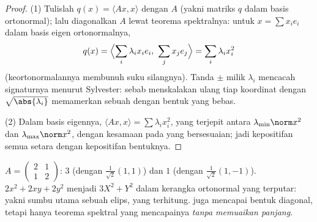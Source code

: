 \begin{proof}
(1) Tulislah $q(x) = \langle A x, x\rangle$ dengan $A$  (yakni
matriks $q$ dalam basis ortonormal); lalu diagonalkan $A$ lewat
teorema spektralnya: untuk $x = \sum x_ie_i$ dalam basis eigen
ortonormalnya,
\[
q(x) = \Bigl\langle \sum_i \lambda_ix_ie_i,\ \sum_j
x_je_j\Bigr\rangle = \sum_i \lambda_i x_i^2
\]
(keortonormalannya membunuh suku silangnya). Tanda $\pm$ milik
$\lambda_i$ mencacah signaturnya menurut Sylvester: sebab menskalakan ulang tiap
koordinat dengan $\sqrt{\abs{\lambda_i}}$ memamerkan sebuah  dengan bentuk yang bebas.

(2) Dalam basis eigennya, $\langle Ax, x\rangle = \sum \lambda_i
x_i^2$, yang terjepit antara $\lambda_{\min}\norm x^2$ dan
$\lambda_{\max}\norm x^2$, dengan kesamaan pada  yang
bersesuaian; jadi kepositifan semua  setara
dengan kepositifan bentuknya.
\end{proof}

\begin{example}\label{ex:b2:quadratic:spectralexample}
$A = \begin{pmatrix} 2 & 1\\ 1 & 2 \end{pmatrix}$:  $3$
(dengan  $\frac{1}{\sqrt2}(1,1)$) dan $1$
(dengan $\frac{1}{\sqrt2}(1,-1)$).  $2x^2 + 2xy + 2y^2$
menjadi $3X^2 + Y^2$ dalam kerangka ortonormal yang terputar: yakni
sumbu utama sebuah elips, yang terhitung.  juga mencapai
bentuk diagonal, tetapi hanya teorema spektral yang mencapainya \emph{tanpa
memuaikan panjang}.
\end{example}

